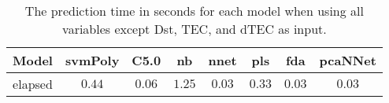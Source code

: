 \begin{table}[!ht]
	\centering
	\begin{tabular}{|c|c|c|c|c|c|c|c|}
		\hline
		Model & svmPoly & C5.0 & nb & nnet & pls & fda & pcaNNet \\ \hline
		elapsed & $0.44$ & $0.06$ & $1.25$ & $0.03$ & $0.33$ & $0.03$ & $0.03$ \\ \hline
	\end{tabular}
	\caption{The prediction time in seconds for each model when using all variables except Dst, TEC, and dTEC as input.}
	\label{tab:time:reverse:noTEC:predict}
\end{table}

